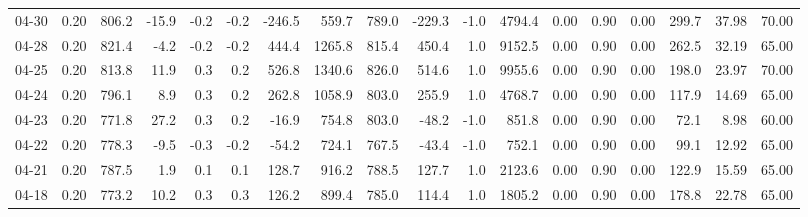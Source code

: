 \begin{threeparttable}
{\begin{tabular}{lrrrrrrrrrrrrrrrrr}
  04-30 &     0.20 & 806.2 &             -15.9 &              -0.2 &               -0.2 &             -246.5 &  559.7 & 789.0 &     -229.3 &                     -1.0 &              4794.4 &       0.00 &      0.90 &           0.00 &            299.7 &           37.98 &                  70.00 \\
  04-28 &     0.20 & 821.4 &              -4.2 &              -0.2 &               -0.2 &              444.4 & 1265.8 & 815.4 &      450.4 &                      1.0 &              9152.5 &       0.00 &      0.90 &           0.00 &            262.5 &           32.19 &                  65.00 \\
  04-25 &     0.20 & 813.8 &              11.9 &               0.3 &                0.2 &              526.8 & 1340.6 & 826.0 &      514.6 &                      1.0 &              9955.6 &       0.00 &      0.90 &           0.00 &            198.0 &           23.97 &                  70.00 \\
  04-24 &     0.20 & 796.1 &               8.9 &               0.3 &                0.2 &              262.8 & 1058.9 & 803.0 &      255.9 &                      1.0 &              4768.7 &       0.00 &      0.90 &           0.00 &            117.9 &           14.69 &                  65.00 \\
  04-23 &     0.20 & 771.8 &              27.2 &               0.3 &                0.2 &              -16.9 &  754.8 & 803.0 &      -48.2 &                     -1.0 &               851.8 &       0.00 &      0.90 &           0.00 &             72.1 &            8.98 &                  60.00 \\
  04-22 &     0.20 & 778.3 &              -9.5 &              -0.3 &               -0.2 &              -54.2 &  724.1 & 767.5 &      -43.4 &                     -1.0 &               752.1 &       0.00 &      0.90 &           0.00 &             99.1 &           12.92 &                  65.00 \\
  04-21 &     0.20 & 787.5 &               1.9 &               0.1 &                0.1 &              128.7 &  916.2 & 788.5 &      127.7 &                      1.0 &              2123.6 &       0.00 &      0.90 &           0.00 &            122.9 &           15.59 &                  65.00 \\
  04-18 &     0.20 & 773.2 &              10.2 &               0.3 &                0.3 &              126.2 &  899.4 & 785.0 &      114.4 &                      1.0 &              1805.2 &       0.00 &      0.90 &           0.00 &            178.8 &           22.78 &                  65.00 \\

\end{tabular}}
\end{threeparttable}
